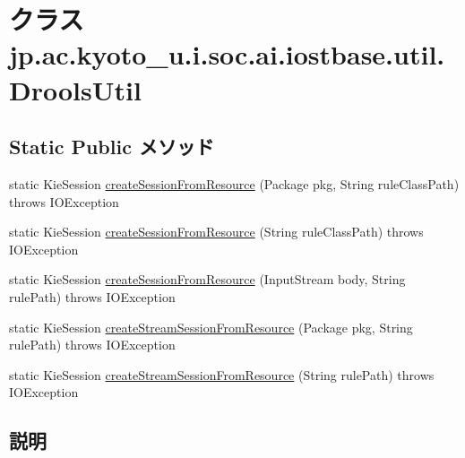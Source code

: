 \hypertarget{classjp_1_1ac_1_1kyoto__u_1_1i_1_1soc_1_1ai_1_1iostbase_1_1util_1_1_drools_util}{\section{クラス jp.\-ac.\-kyoto\-\_\-u.\-i.\-soc.\-ai.\-iostbase.\-util.\-Drools\-Util}
\label{classjp_1_1ac_1_1kyoto__u_1_1i_1_1soc_1_1ai_1_1iostbase_1_1util_1_1_drools_util}
}
\subsection*{Static Public メソッド}
\begin{DoxyCompactItemize}
\item 
static Kie\-Session \hyperlink{classjp_1_1ac_1_1kyoto__u_1_1i_1_1soc_1_1ai_1_1iostbase_1_1util_1_1_drools_util_a4f8a785fcf6c81f66e8507982d2575bb}{create\-Session\-From\-Resource} (Package pkg, String rule\-Class\-Path)  throws I\-O\-Exception
\item 
static Kie\-Session \hyperlink{classjp_1_1ac_1_1kyoto__u_1_1i_1_1soc_1_1ai_1_1iostbase_1_1util_1_1_drools_util_abd632eaf75a6488c53c80698e378e9d1}{create\-Session\-From\-Resource} (String rule\-Class\-Path)  throws I\-O\-Exception
\item 
static Kie\-Session \hyperlink{classjp_1_1ac_1_1kyoto__u_1_1i_1_1soc_1_1ai_1_1iostbase_1_1util_1_1_drools_util_a60e4d7859c0994c301d31410e15ac6ca}{create\-Session\-From\-Resource} (Input\-Stream body, String rule\-Path)  throws I\-O\-Exception
\item 
static Kie\-Session \hyperlink{classjp_1_1ac_1_1kyoto__u_1_1i_1_1soc_1_1ai_1_1iostbase_1_1util_1_1_drools_util_a4653939bfd8666717fe8cb4015447962}{create\-Stream\-Session\-From\-Resource} (Package pkg, String rule\-Path)  throws I\-O\-Exception
\item 
static Kie\-Session \hyperlink{classjp_1_1ac_1_1kyoto__u_1_1i_1_1soc_1_1ai_1_1iostbase_1_1util_1_1_drools_util_ac5190a6852943942f9c24612486f870a}{create\-Stream\-Session\-From\-Resource} (String rule\-Path)  throws I\-O\-Exception
\end{DoxyCompactItemize}


\subsection{説明}


